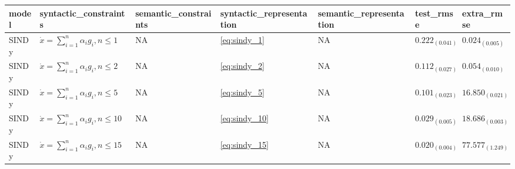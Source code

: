 \begin{tabular}{lllllll}
\toprule
model & syntactic_constraints & semantic_constraints & syntactic_representation & semantic_representation & test_rmse & extra_rmse \\
\midrule
SINDy & $\dot{x}=\sum_{i=1}^n \alpha_i g_i, n \leq 1$ & NA & \cref{eq:sindy_1} & NA & $0.222_{(0.041)}$ & $0.024_{(0.005)}$ \\
SINDy & $\dot{x}=\sum_{i=1}^n \alpha_i g_i, n \leq 2$ & NA & \cref{eq:sindy_2} & NA & $0.112_{(0.027)}$ & $0.054_{(0.010)}$ \\
SINDy & $\dot{x}=\sum_{i=1}^n \alpha_i g_i, n \leq 5$ & NA & \cref{eq:sindy_5} & NA & $0.101_{(0.023)}$ & $16.850_{(0.021)}$ \\
SINDy & $\dot{x}=\sum_{i=1}^n \alpha_i g_i, n \leq 10$ & NA & \cref{eq:sindy_10} & NA & $0.029_{(0.005)}$ & $18.686_{(0.003)}$ \\
SINDy & $\dot{x}=\sum_{i=1}^n \alpha_i g_i, n \leq 15$ & NA & \cref{eq:sindy_15} & NA & $0.020_{(0.004)}$ & $77.577_{(1.249)}$ \\
\bottomrule
\end{tabular}
